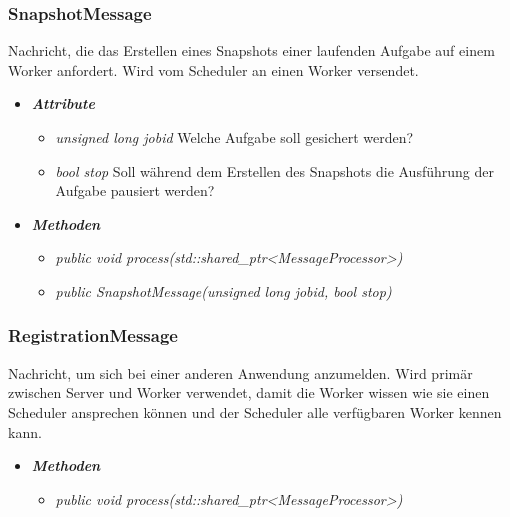 \documentclass[a4paper,12pt]{article}
\begin{document}
\subsubsection{SnapshotMessage}

Nachricht, die das Erstellen eines Snapshots einer laufenden Aufgabe auf einem Worker anfordert. Wird vom Scheduler an einen Worker versendet.

	\begin{itemize}[label={}]

	\item\textit{\textbf{Attribute}}
		\begin{itemize}[label={\textbullet}]
			\item\textit{unsigned long jobid} Welche Aufgabe soll gesichert werden?
			\item\textit{bool stop} Soll während dem Erstellen des Snapshots die Ausführung der Aufgabe pausiert werden?
			
		\end{itemize}

	\item\textit{\textbf{Methoden}}
		\begin{itemize}[label={\textbullet}]
			\item\textit{public void process(std::shared\_ptr<MessageProcessor>)}
			\item\textit{public SnapshotMessage(unsigned long jobid, bool stop)}

		\end{itemize}

\end{itemize}


\subsubsection{RegistrationMessage}

Nachricht, um sich bei einer anderen Anwendung anzumelden. Wird primär zwischen Server und Worker verwendet, damit die Worker wissen wie sie einen Scheduler ansprechen können und der Scheduler alle verfügbaren Worker kennen kann.

	\begin{itemize}[label={}]

	\item\textit{\textbf{Methoden}}
		\begin{itemize}[label={\textbullet}]
			\item\textit{public void process(std::shared\_ptr<MessageProcessor>)}

		\end{itemize}

\end{itemize}
\end{document}

